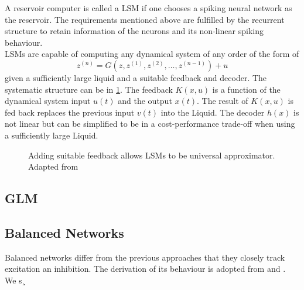 A reservoir computer is called a \ac{LSM} if one chooses a spiking neural network as the reservoir. The requirements mentioned above are fulfilled by the recurrent structure to retain information of the neurons and its non-linear spiking behaviour.\\
\acp{LSM} are capable of computing any dynamical system of any order of the form of
\begin{equation}
	z^{(n)} = G(z,z^{(1)},z^{(2)},\dots,z^{(n-1)}) + u
\end{equation}
given a sufficiently large liquid and a suitable feedback and decoder\cite{maass_computational_2004}. The systematic structure can be in \cref{fig:LSM_feedback}. The feedback $K(x,u)$ is a function of the dynamical system input $u(t)$ and the output $x(t)$. The result of $K(x,u)$ is fed back replaces the previous input $v(t)$ into the Liquid. The decoder $h(x)$ is not linear but can be simplified to be in a cost-performance trade-off when using a sufficiently large Liquid.\\
\begin{figure}[htbp]
	\centering
	
	\caption{Adding suitable feedback allows \acp{LSM} to be universal approximator. Adapted from \cite{maass_computational_2007}}
	\label{fig:LSM_feedback}
\end{figure}


\subsection{GLM}

\subsection{Balanced Networks}
Balanced networks differ from the previous approaches that they closely track excitation an inhibition. The derivation of its behaviour is adopted from \cite{boerlin_predictive_2013} and \cite{huang_optimizing_2017}.\\
We s¸

